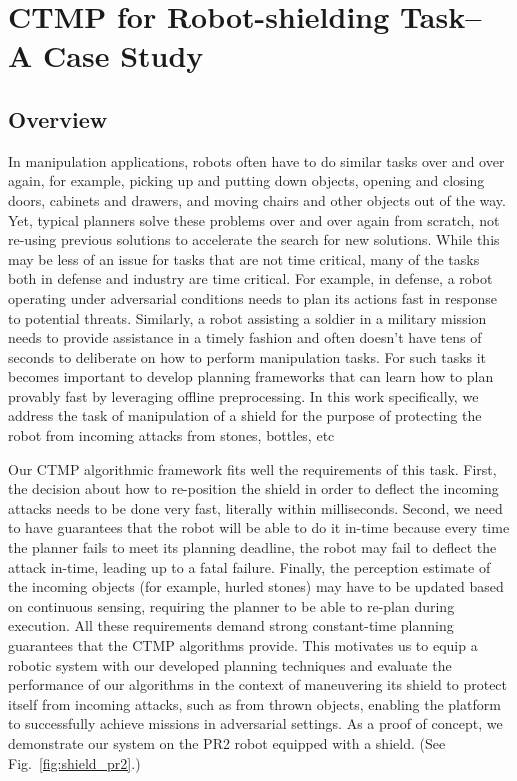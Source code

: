 \documentclass[a4paper]{report}
\begin{document}
\newpage

\chapter{CTMP for Robot-shielding Task-- A Case Study}
\section{Overview}
In manipulation applications, robots often have to do similar tasks over and over again, for example, picking up and putting down objects, opening and closing doors, cabinets and drawers, and moving chairs and other objects out of the way. Yet, typical planners solve these problems over and over again from scratch, not re-using previous solutions to accelerate the search for new solutions. While this may be less of an issue for tasks that are not time critical, many of the tasks both in defense and industry are time critical. For example, in defense, a robot operating under adversarial conditions needs to plan its actions fast in response to potential threats. Similarly, a robot assisting a soldier in a military mission needs to provide assistance in a timely fashion and often doesn’t have tens of seconds to deliberate on how to perform manipulation tasks. For such tasks it becomes important to develop planning frameworks that can learn how to plan provably fast by leveraging offline preprocessing. In this work specifically, we address the task of manipulation of a shield for the purpose of protecting the robot from incoming attacks from stones, bottles, etc

Our CTMP algorithmic framework fits well the requirements of this task. First, the decision about how to re-position the shield in order to deflect the incoming attacks needs to be done very fast, literally within milliseconds. Second, we need to have guarantees that the robot will be able to do it in-time because every time the planner fails to meet its planning deadline, the robot may fail to deflect the attack in-time, leading up to a fatal failure. Finally, the perception estimate of the incoming objects (for example, hurled stones) may have to be updated based on continuous sensing, requiring the planner to be able to re-plan during execution. All these requirements demand strong constant-time planning guarantees that the CTMP algorithms provide. This motivates us to equip a robotic system with our developed planning techniques and evaluate the performance of our algorithms in the context of maneuvering its shield to protect itself from incoming attacks, such as from thrown objects, enabling the platform to successfully achieve missions in adversarial settings.
As a proof of concept, we demonstrate our system on the PR2 robot equipped with a shield. (See Fig.~\ref{fig:shield_pr2}.)
\end{document}
